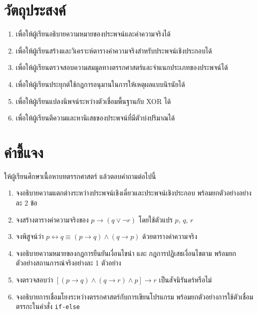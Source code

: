 \newpage
{}
\section*{วัตถุประสงค์}
\begin{enumerate}
    \item เพื่อให้ผู้เรียนอธิบายความหมายของประพจน์และค่าความจริงได้
    \item เพื่อให้ผู้เรียนสร้างและวิเคราะห์ตารางค่าความจริงสำหรับประพจน์เชิงประกอบได้
    \item เพื่อให้ผู้เรียนตรวจสอบความสมมูลทางตรรกศาสตร์และจำแนกประเภทของประพจน์ได้
    \item เพื่อให้ผู้เรียนประยุกต์ใช้กฎการอนุมานในการให้เหตุผลแบบนิรนัยได้
    \item เพื่อให้ผู้เรียนแปลงนิพจน์ระหว่างตัวเชื่อมพื้นฐานกับ XOR ได้
    \item เพื่อให้ผู้เรียนตีความและหานิเสธของประพจน์ที่มีตัวบ่งปริมาณได้
\end{enumerate}
\section*{คำชี้แจง} ให้ผู้เรียนศึกษาเนื้อหาบทตรรกศาสตร์ แล้วตอบคำถามต่อไปนี้
\begin{enumerate}
    \item จงอธิบายความแตกต่างระหว่างประพจน์เชิงเดี่ยวและประพจน์เชิงประกอบ พร้อมยกตัวอย่างอย่างละ 2 ข้อ
    \item จงสร้างตารางค่าความจริงของ $p \rightarrow (q \lor \neg r)$ โดยใช้ตัวแปร $p$, $q$, $r$
    \item จงพิสูจน์ว่า $p \leftrightarrow q \equiv (p \rightarrow q) \land (q \rightarrow p)$ ด้วยตารางค่าความจริง
    \item จงอธิบายความหมายของกฎการยืนยันเงื่อนไขนำ และ กฎการปฏิเสธเงื่อนไขตาม พร้อมยกตัวอย่างสถานการณ์จริงอย่างละ 1 ตัวอย่าง
    \item จงตรวจสอบว่า $[(p \rightarrow q) \land (q \rightarrow r) \land p] \rightarrow r$ เป็นสัจนิรันดร์หรือไม่
    \item จงอธิบายการเชื่อมโยงระหว่างตรรกศาสตร์กับการเขียนโปรแกรม พร้อมยกตัวอย่างการใช้ตัวเชื่อมตรรกะในคำสั่ง \texttt{if-else}
\end{enumerate}
